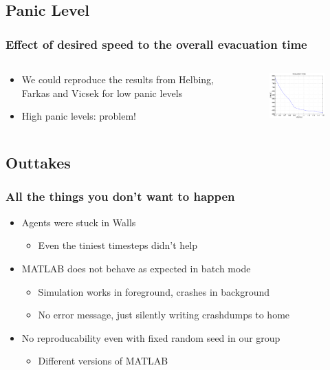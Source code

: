 \documentclass{beamer}
\begin{document}
\subsection{Panic Level}
\begin{frame}
	\frametitle{Effect of desired speed to the overall evacuation time}
	\begin{columns}
		\begin{column}{5cm}
			\begin{itemize}
				\item We could reproduce the results from Helbing, Farkas and Vicsek for low panic levels
				\item High panic levels: problem!
			\end{itemize}
		\end{column}
		\begin{column}{5cm}
			\begin{figure}
				\includegraphics[width=5cm]{images/evactimes1to11.eps}
			\end{figure}
		\end{column}
	\end{columns}
\end{frame}

\subsection{Outtakes}

\begin{frame}
	\frametitle{All the things you don't want to happen}
	\begin{itemize}
		\item Agents were stuck in Walls
		\begin{itemize}
			\item Even the tiniest timesteps didn't help
		\end{itemize}
		\item MATLAB does not behave as expected in batch mode
		\begin{itemize}
			\item Simulation works in foreground, crashes in background
			\item No error message, just silently writing crashdumps to home
		\end{itemize}
		\item No reproducability even with fixed random seed in our group
		\begin{itemize}
			\item Different versions of MATLAB
		\end{itemize}
	\end{itemize}
\end{frame}
\end{document}
